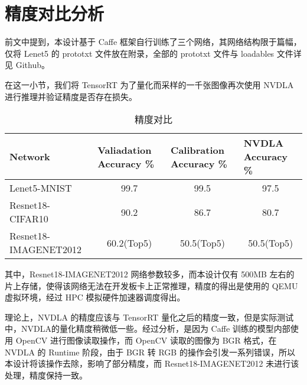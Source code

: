 \section{精度对比分析}

前文中提到，本设计基于 Caffe 框架自行训练了三个网络，其网络结构限于篇幅，仅将 Lenet5 的 prototxt 文件放在附录，全部的 prototxt 文件与 loadables 文件详见 Github\cite{nvdla_loadables}。

在这一小节，我们将 TensorRT 为了量化而采样的一千张图像再次使用 NVDLA 进行推理并验证精度是否存在损失。

\begin{table}[!htbp]
    \caption{精度对比}
    \label{tab:Qualifications Report}
    \centering
    \footnotesize%
    \setlength{\tabcolsep}{4pt}%
    \renewcommand{\arraystretch}{1.2}%
    \begin{tabular}{lccc}
        \toprule
        \textbf{Network}      & \multicolumn{1}{l}{\textbf{Valiadation Accuracy \%}} & \multicolumn{1}{l}{\textbf{Calibration Accuracy \%}}  & \multicolumn{1}{l}{\textbf{NVDLA Accuracy \%}} \\
        \midrule
        Lenet5-MNIST          & 99.7                                                 & 99.5                                                 & 97.5                                                 \\  
        Resnet18-CIFAR10      & 90.2                                                 & 86.7                                                 & 80.7                                                 \\
        Resnet18-IMAGENET2012 & 60.2(Top5)                                           & 50.5(Top5)                                           & 50.5(Top5)                                           \\
        \bottomrule                   
    \end{tabular}
\end{table}

其中，Resnet18-IMAGENET2012 网络参数较多，而本设计仅有 500MB 左右的片上存储，使得该网络无法在开发板卡上正常推理，精度的得出是使用的 QEMU 虚拟环境，经过 HPC 模拟硬件加速器调度得出。

理论上，NVDLA 的精度应该与 TensorRT 量化之后的精度一致，但是实际测试中，NVDLA的量化精度稍微低一些。经过分析，是因为 Caffe 训练的模型内部使用 OpenCV 进行图像读取操作，而 OpenCV 读取的图像为 BGR 格式，在 NVDLA 的 Runtime 阶段，由于 BGR 转 RGB 的操作会引发一系列错误，所以本设计将该操作去除，影响了部分精度，而 Resnet18-IMAGENET2012 未进行该处理，精度保持一致。

